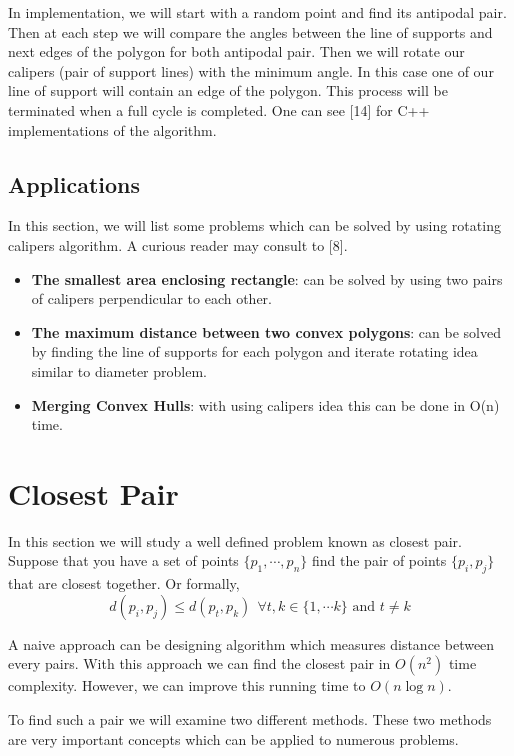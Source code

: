 \documentclass[12pt]{article}
\begin{document}
In implementation, we will start with a random point and find its antipodal pair. Then at each step we will compare the angles between the line of supports and next edges of the polygon for both antipodal pair. Then we will rotate our calipers (pair of support lines) with the minimum angle. In this case one of our line of support will contain an edge of the polygon. This process will be terminated when a full cycle is completed. One can see [14] for C++ implementations of the algorithm.


\subsection{Applications}
In this section, we will list some problems which can be solved by using 
rotating calipers algorithm. A curious reader may consult to [8].
\begin{itemize}
  \item \textbf{The smallest area enclosing rectangle}: can be solved by using two
  pairs of calipers perpendicular to each other.
  \item \textbf{The maximum distance between two convex polygons}: can be solved by
  finding the line of supports for each polygon and iterate rotating idea similar to
  diameter problem.
  \item \textbf{Merging Convex Hulls}: with using calipers idea this can be done
  in O(n) time.
\end{itemize}

\section{Closest Pair}
In this section we will study a well defined problem known as closest pair.
Suppose that you have a set of points $\{p_1,\cdots,p_n\}$ find the pair of points $\{p_i,p_j\}$
that are closest together. Or formally,
$$ d(p_i, p_j) \leq d(p_t, p_k) \ \ \forall t,k \in \{1,\cdots k\} \text{ and } t \neq k $$

A naive approach can be designing algorithm which measures distance between every
pairs. With this approach we can find the closest pair in $O(n^2)$ time complexity.
However, we can improve this running time to $O(n \log n)$.

To find such a pair we will examine two different methods. These two methods 
are very important concepts which can be applied to numerous problems.
\end{document}
